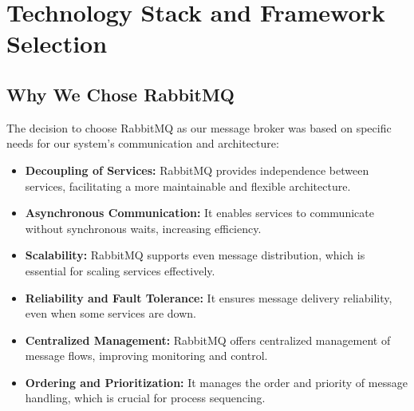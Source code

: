 \section{Technology Stack and Framework Selection}

\subsection*{Why We Chose RabbitMQ}
The decision to choose RabbitMQ as our message broker was based on specific needs for our system's communication and architecture:

\begin{itemize}
    \item \textbf{Decoupling of Services:} RabbitMQ provides independence between services, facilitating a more maintainable and flexible architecture.
    \item \textbf{Asynchronous Communication:} It enables services to communicate without synchronous waits, increasing efficiency.
    \item \textbf{Scalability:} RabbitMQ supports even message distribution, which is essential for scaling services effectively.
    \item \textbf{Reliability and Fault Tolerance:} It ensures message delivery reliability, even when some services are down.
    \item \textbf{Centralized Management:} RabbitMQ offers centralized management of message flows, improving monitoring and control.
    \item \textbf{Ordering and Prioritization:} It manages the order and priority of message handling, which is crucial for process sequencing.
\end{itemize}


